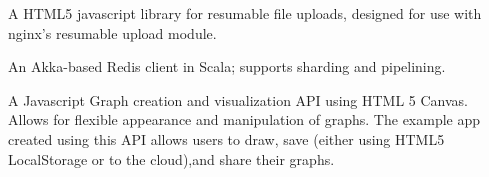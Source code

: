 \documentclass[11pt,a4paper,sans]{moderncv}
\begin{document}
  {A HTML5 javascript library for resumable file uploads, designed for use with nginx's resumable upload module. }

  {An Akka-based Redis client in Scala; supports sharding and pipelining.}

  {A Javascript Graph creation and visualization API using HTML 5 Canvas. Allows for flexible appearance and manipulation of graphs.  The example app created using this API allows users to draw, save (either using HTML5 LocalStorage or to the cloud),and share their graphs. }

\end{document}
